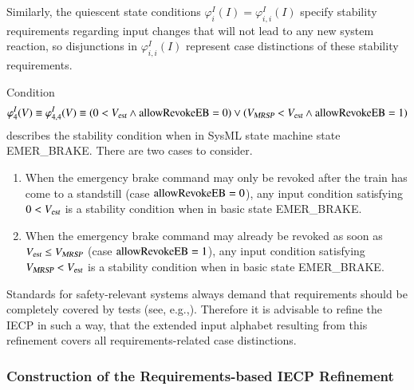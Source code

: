 Similarly, the quiescent state conditions $\varphi_i^I(I) = \varphi_{i,i}^I(I)$ specify stability requirements regarding input changes that will not lead to any new system reaction, so disjunctions in $\varphi_{i,i}^I(I)$ represent case distinctions of these stability requirements.
\begin{example}
Condition
$$
\varphi_4^I(V) \equiv  \varphi_{4,4}^I(V)   \equiv    (0 < {V_{\text{\sl est}}}   \wedge \text{allowRevokeEB}=0) \vee ({V_{\text{\sl MRSP}}} < {V_{\text{\sl est}}}  \wedge \text{allowRevokeEB}=1)
$$
describes the stability condition when in SysML state machine state {\sf EMER\_BRAKE}. There are two cases to consider.
\begin{enumerate}
\item When the emergency brake command may only be revoked after the train has come to a standstill 
(case $\text{allowRevokeEB}=0$),  any input condition satisfying $0 < {V_{\text{\sl est}}}$ is a stability condition when in basic state {\sf EMER\_BRAKE}.

\item When the emergency brake command may already be revoked as soon as ${V_{\text{\sl est}}} \leq {V_{\text{\sl MRSP}}}$
(case $\text{allowRevokeEB}=1$), any input condition satisfying ${V_{\text{\sl MRSP}}} < {V_{\text{\sl est}}}$ is a stability condition when in basic state {\sf EMER\_BRAKE}.
\end{enumerate}
\xbox
\end{example}

Standards for safety-relevant systems always demand that requirements should be completely covered by tests (see, e.g.,\cite[6.4.4]{DO178C}). Therefore it is advisable to refine the IECP in such a way, that the extended input alphabet resulting from this refinement covers all requirements-related case distinctions.





\subsubsection{Construction of the Requirements-based IECP Refinement}

